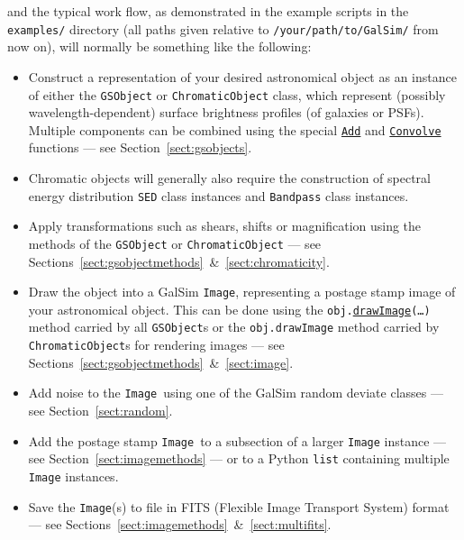 \documentclass[preprint,11pt]{../../devel/modules/aastex}
\begin{document}
and the typical work flow, as demonstrated in the example scripts in the {\tt
examples/} directory (all paths given relative to
\texttt{/your/path/to/GalSim/} from now on), will normally
be something like the following:
\begin{itemize}

\item Construct a representation of your desired astronomical object
  as an instance of either the {\tt GSObject} or {\tt ChromaticObject} class, which represent (possibly wavelength-dependent) surface brightness profiles (of galaxies or PSFs).  Multiple components can be
  combined using the special
  \href{http://galsim-developers.github.com/GalSim/classgalsim_1_1base_1_1_add.html}{\texttt{Add}}
  and
  \href{http://galsim-developers.github.com/GalSim/classgalsim_1_1base_1_1_convolve.html}{\texttt{Convolve}}
  functions --- see Section~\ref{sect:gsobjects}.
\item Chromatic objects will generally also require the construction of spectral energy distribution
  {\tt SED} class instances and {\tt Bandpass} class instances.
\item Apply transformations such as shears, shifts or magnification
  using the methods of the \texttt{GSObject} or \texttt{ChromaticObject} --- see
  Sections~\ref{sect:gsobjectmethods}~\&~\ref{sect:chromaticity}.
\item Draw the object into a GalSim \texttt{Image}, representing a postage
  stamp image of your astronomical object.  This can be done using the
  \texttt{obj.}\href{http://galsim-developers.github.com/GalSim/classgalsim_1_1base_1_1_g_s_object.html#ae0b346a8b438dedbc7f60a52220869d8}{\texttt{drawImage}}\texttt{(\dots)}
  method carried by all \texttt{GSObject}s or the \texttt{obj.drawImage} method carried by
  \texttt{ChromaticObject}s for rendering images --- see
  Sections~\ref{sect:gsobjectmethods}~\&~\ref{sect:image}.
\item Add noise to the \texttt{Image}~using one of the GalSim
  random deviate classes --- see Section~\ref{sect:random}.
\item Add the postage stamp \texttt{Image}~to a subsection of a larger
  \texttt{Image}
  instance --- see
  Section~\ref{sect:imagemethods} --- or to a Python
  \texttt{list} containing multiple \texttt{Image} instances.
\item Save the \texttt{Image}(s) to file in FITS (Flexible Image Transport
  System) format --- see Sections~\ref{sect:imagemethods}~\&~\ref{sect:multifits}.
\end{itemize}
\end{document}
